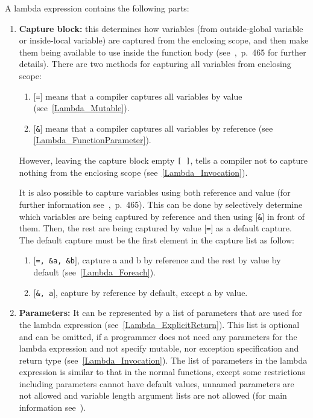\documentclass[11pt]{report}
\begin{document}
A lambda expression contains the following parts:
\begin{enumerate}
\item \textbf{Capture block:} this determines how variables (from outside-global variable or inside-local variable) are captured from the enclosing scope, and then make them being available to use inside the function body (see~\cite{Gregorie:professionalcpp},~p.~465 for further details). There are two methods for capturing all variables from enclosing scope:

      \begin{enumerate}
      \item \texttt{$[$=$]$} means that a compiler captures all variables by value (see~\ref{Lambda_Mutable}).
      \item \texttt{$[$\&$]$} means that a compiler captures all variables by reference (see~     \ref{Lambda_FunctionParameter}).
      \end{enumerate}
      However, leaving the capture block empty \texttt{[~]}, tells a compiler not to capture nothing from the enclosing scope (see~\ref{Lambda_Invocation}).
      
It is also possible to capture variables using both reference and value (for further information see~\cite{Gregorie:professionalcpp},~p.~465). This can be done by selectively determine which variables are being captured by reference and then using \texttt{$[$\&$]$} in front of them. Then, the rest are being captured by value \texttt{$[$=$]$} as a default capture. The default capture must be the first element in the capture list as follow:
      \begin{enumerate}
      \item \texttt{$[$=,~\&a,~\&b$]$}, capture a and b by reference and the rest by value by default (see~\ref{Lambda_Foreach}).
      \item \texttt{$[$\&,~a$]$}, capture by reference by default, except a by value.
      \end{enumerate}
      
      
\item \textbf{Parameters:} It can be represented by a list of parameters that are used for the lambda expression (see~\ref{Lambda_ExplicitReturn}). This list is optional and can be omitted, if a programmer does not need any parameters for the lambda expression and not specify mutable, nor exception specification and return type (see~\ref{Lambda_Invocation}). The list of parameters in the lambda expression is similar to that in the normal functions, except some restrictions including parameters cannot have default values, unnamed parameters are not allowed and variable length argument lists are not allowed (for main information see~\cite{Cppreference:2012:Cpp11}).


\end{enumerate}
\end{document}
